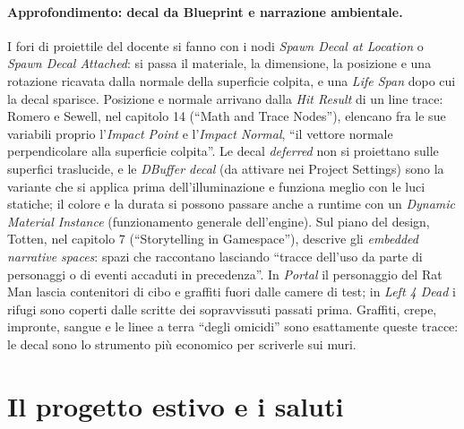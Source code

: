 \paragraph{Approfondimento: decal da Blueprint e narrazione ambientale.} I fori di proiettile
del docente si fanno con i nodi \emph{Spawn Decal at Location} o \emph{Spawn Decal Attached}:
si passa il materiale, la dimensione, la posizione e una rotazione ricavata dalla normale della
superficie colpita, e una \emph{Life Span} dopo cui la decal sparisce. Posizione e normale
arrivano dalla \emph{Hit Result} di un line trace: Romero e Sewell, nel capitolo 14 (``Math and
Trace Nodes''), elencano fra le sue variabili proprio l'\emph{Impact Point} e l'\emph{Impact
Normal}, ``il vettore normale perpendicolare alla superficie colpita''. Le decal \emph{deferred}
non si proiettano sulle superfici traslucide, e le \emph{DBuffer decal} (da attivare nei
Project Settings) sono la variante che si applica prima dell'illuminazione e funziona meglio con
le luci statiche; il colore e la durata si possono passare anche a runtime con un
\emph{Dynamic Material Instance} (funzionamento generale dell'engine). Sul piano del design,
Totten, nel capitolo 7 (``Storytelling in Gamespace''), descrive gli \emph{embedded narrative
spaces}: spazi che raccontano lasciando ``tracce dell'uso da parte di personaggi o di eventi
accaduti in precedenza''. In \emph{Portal} il personaggio del Rat Man lascia contenitori di cibo
e graffiti fuori dalle camere di test; in \emph{Left 4 Dead} i rifugi sono coperti dalle scritte
dei sopravvissuti passati prima. Graffiti, crepe, impronte, sangue e le linee a terra
``degli omicidi'' sono esattamente queste tracce: le decal sono lo strumento più economico per
scriverle sui muri.

\section{Il progetto estivo e i saluti}
\label{ue16:sec:chiusura}

